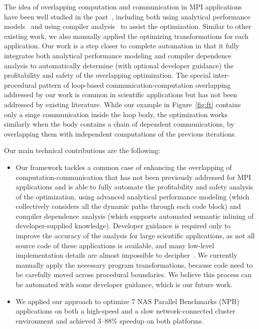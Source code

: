 The idea of overlapping computation and communication in MPI applications have been
well studied in the past~\cite{danalis:sc05,fishgold:ipdps06}, including both using analytical performance
models~\cite{iancu:ppopp07}
and using compiler analysis~\cite{danalis:ics09} to assist the optimization.
Similar to other existing work, we also manually applied the optimizing transformations for each application.
Our work is a step closer to complete automation in that it fully integrates both analytical performance modeling and compiler dependence analysis to automatically
determine (with optional developer guidance) the profitability and safety of the overlapping optimization. %
The special inter-procedural pattern of loop-based
communication-computation overlapping addressed by our work is common in scientific applications but has not been addressed
by existing literature. While our example in Figure~\ref{fig:ft} contains only a singe communication inside the loop body, the optimization works similarly
when the body contains a chain of dependent communications, by overlapping them with independent computations of the previous iterations.

Our main technical contributions are the following:

\begin{itemize}

\item Our framework tackles a common case of enhancing the overlapping of computation-communication that has not been previously addressed for MPI applications and
is able to fully automate the profitability and safety analysis of the optimization, using advanced analytical performance
modeling (which collectively considers all the dynamic paths through each code block) and compiler dependence analysis
(which supports automated semantic inlining of developer-supplied knowledge). Developer guidance is required only to improve the
accuracy of the analysis for large scientific applications, as not all source code
of these applications is available, and many low-level implementation details are almost impossible to decipher~\cite{POET:ICPP11}.
 We currently manually apply the necessary program transformations,
  because code need to be carefully moved across procedural boundaries. We believe this process can be automated with some developer
guidance, which is our future work.

\item We applied our approach to optimize 7 NAS Parallel Benchmarks
  (NPB) applications on both a high-speed and a slow network-connected
  cluster environment and achieved 3--88\% speedup on both platforms.

\end{itemize}


